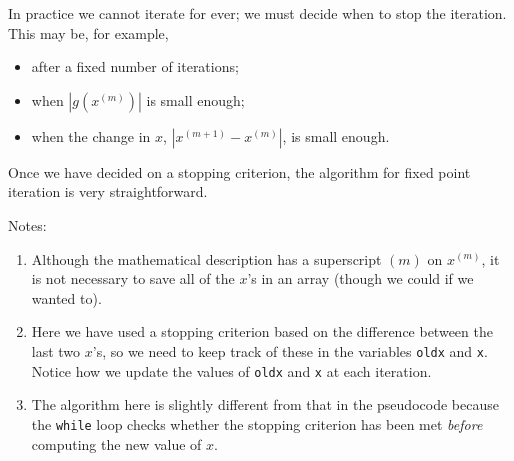 In practice we cannot iterate for ever; we must decide when to stop the iteration.
This may be, for example,
\begin{itemize}
\item
after a fixed number of iterations;
\item
when $|g(x^{(m)})|$ is small enough;
\item
when the change in $x$, $|x^{(m+1)} - x^{(m)}|$, is small enough.
\end{itemize}

Once we have decided on a stopping criterion, the algorithm for fixed point
iteration is very straightforward.












\noindent
Notes:
\begin{enumerate}
\item
Although the mathematical description has a superscript $(m)$ on $x^{(m)}$,
it is not necessary to save all of the $x$'s in an array (though we could if
we wanted to).
\item
Here we have used a stopping criterion based on the difference between the
last two $x$'s, so we need to keep track of these in the variables \texttt{oldx}
and \texttt{x}. Notice how we update the values of \texttt{oldx}
and \texttt{x} at each iteration.
\item
The algorithm here is slightly different from that in the pseudocode because
the \texttt{while} loop checks whether the stopping criterion has been met
\textit{before} computing the new value of $x$.
\end{enumerate}


